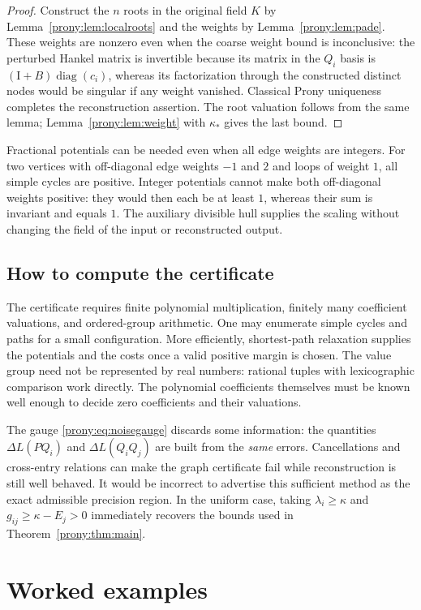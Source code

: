 \documentclass[11pt,letterpaper]{article}
\theoremstyle{definition}
\theoremstyle{remark}
\newcommand{\Id}{\mathrm I}
\DeclareMathOperator{\diag}{diag}
\begin{document}
\begin{proof}
Construct the $n$ roots in the original field $K$ by Lemma~\ref{prony:lem:localroots} and the weights by
Lemma~\ref{prony:lem:pade}. These weights are nonzero even when the coarse weight
bound is inconclusive: the perturbed Hankel matrix is invertible because
its matrix in the $Q_i$ basis is $(\Id+B)\diag(c_i)$, whereas its
factorization through the constructed distinct nodes would be singular
if any weight vanished. Classical Prony uniqueness completes the
reconstruction assertion. The root valuation follows from the same lemma;
Lemma~\ref{prony:lem:weight} with $\kappa_*$ gives the last bound.
\end{proof}

Fractional potentials can be needed even when all edge weights are
integers. For two vertices with off-diagonal edge weights $-1$ and $2$
and loops of weight $1$, all simple cycles are positive. Integer
potentials cannot make both off-diagonal weights positive: they would
then each be at least $1$, whereas their sum is invariant and equals $1$.
The auxiliary divisible hull supplies the scaling without changing the
field of the input or reconstructed output.

\subsection{How to compute the certificate}
The certificate requires finite polynomial multiplication, finitely many
coefficient valuations, and ordered-group arithmetic. One may enumerate
simple cycles and paths for a small configuration. More efficiently,
shortest-path relaxation supplies the potentials and the costs once a
valid positive margin is chosen. The value group need not be represented
by real numbers: rational tuples with lexicographic comparison work directly.
The polynomial coefficients themselves must be known well enough to decide
zero coefficients and their valuations.

The gauge \eqref{prony:eq:noisegauge} discards some information: the quantities
$\Delta L(PQ_i)$ and $\Delta L(Q_iQ_j)$ are built from the \emph{same}
errors. Cancellations and cross-entry relations can make the graph
certificate fail while reconstruction is still well behaved. It would be
incorrect to advertise this sufficient method as the exact admissible
precision region. In the uniform case, taking
$\lambda_i\ge\kappa$ and $g_{ij}\ge\kappa-E_j>0$ immediately recovers the
bounds used in Theorem~\ref{prony:thm:main}.

\section{Worked examples}
\label{prony:sec:examples}
\end{document}
